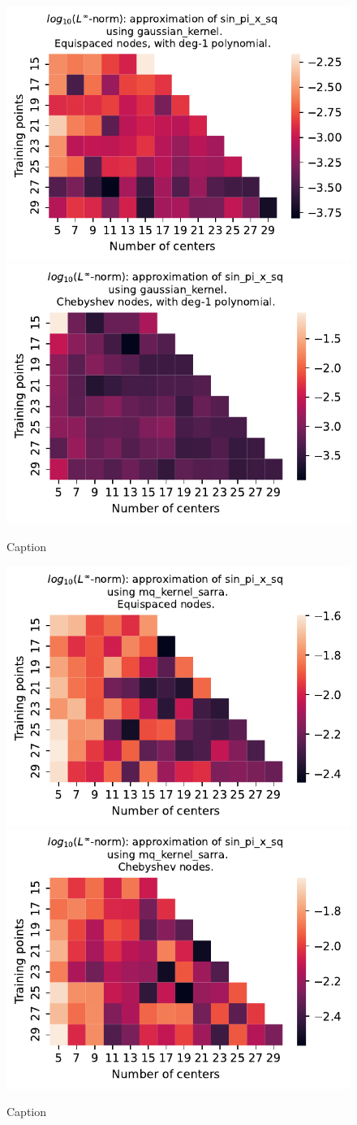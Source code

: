 \documentclass[12pt]{report} %
\begin{document}
\begin{figure}[ht]
    \centering
    
    \includegraphics[width=.49\textwidth]{imagenes/experiments/1d/variational/sin_pi_x_sq-Kgaussian_kernel-Poly-Equi.pdf}
    \includegraphics[width=.49\textwidth]{imagenes/experiments/1d/variational/sin_pi_x_sq-Kgaussian_kernel-Poly-Cheb.pdf}
    \caption{Caption}
    \label{fig:sin-pi-x-sq-gaussian-poly}
\end{figure}


\begin{figure}[ht]
    \centering
    
    \includegraphics[width=.49\textwidth]{imagenes/experiments/1d/variational/sin_pi_x_sq-Kmq_kernel_sarra-Equi.pdf}
    \includegraphics[width=.49\textwidth]{imagenes/experiments/1d/variational/sin_pi_x_sq-Kmq_kernel_sarra-Cheb.pdf}
    \caption{Caption}
    \label{fig:sin-pi-x-sq-sarra}
\end{figure}
\end{document}
